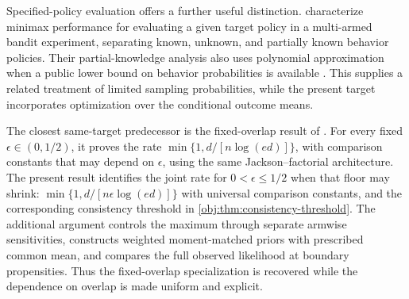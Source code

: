 Specified-policy evaluation offers a further useful distinction. \citet{Ma2022} characterize minimax performance for evaluating a given target policy in a multi-armed bandit experiment, separating known, unknown, and partially known behavior policies. Their partial-knowledge analysis also uses polynomial approximation when a public lower bound on behavior probabilities is available \citep[Section~3.3]{Ma2022}. This supplies a related treatment of limited sampling probabilities, while the present target incorporates optimization over the conditional outcome means.

The closest same-target predecessor is the fixed-overlap result of \citet[Theorem~3]{CausalSmithFixedOverlap2026}. For every fixed \(\epsilon\in(0,1/2)\), it proves the rate \(\min\{1,d/[n\log(ed)]\}\), with comparison constants that may depend on \(\epsilon\), using the same Jackson--factorial architecture. The present result identifies the joint rate for \(0<\epsilon\le1/2\) when that floor may shrink: \(\min\{1,d/[n\epsilon\log(ed)]\}\) with universal comparison constants, and the corresponding consistency threshold in \cref{obj:thm:consistency-threshold}. The additional argument controls the maximum through separate armwise sensitivities, constructs weighted moment-matched priors with prescribed common mean, and compares the full observed likelihood at boundary propensities. Thus the fixed-overlap specialization is recovered while the dependence on overlap is made uniform and explicit.
